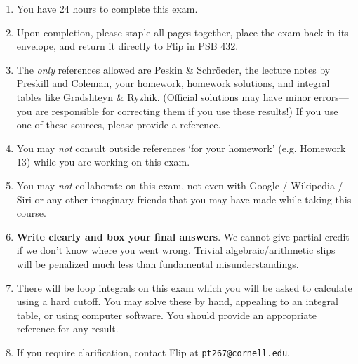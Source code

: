 \documentclass[12pt]{article}
\begin{document}

\vspace{.25cm}

\begin{spacing}{.55}
\begin{enumerate}
\item You have 24 hours to complete this exam. 
\item Upon completion, please staple all pages together, place the exam back in its envelope, and return it directly to Flip in PSB 432.
%
\item The \textit{only} references allowed are Peskin \& Schr\"oeder, the lecture notes by Preskill and Coleman, your homework, homework solutions, and integral tables like Gradshteyn \& Ryzhik. (Official solutions may have minor errors---you are responsible for correcting them if you use these results!) If you use one of these sources, please provide a reference.
\item You may \textit{not} consult outside references `for your homework' (e.g. Homework 13) while you are working on this exam.
\item You may \textit{not} collaborate on this exam, not even with Google / Wikipedia / Siri or any other imaginary friends that you may have made while taking this course.
\item \textbf{Write clearly and box your final answers}. We cannot give partial credit if we don't know where you went wrong. Trivial algebraic/arithmetic slips will be penalized much less than fundamental misunderstandings.
\item There will be loop integrals on this exam which you will be asked to calculate using a hard cutoff. You may solve these by hand, appealing to an integral table, or using computer software. You should provide an appropriate reference for any result.
\item If you require clarification, contact Flip at \texttt{pt267@cornell.edu}.
\end{enumerate}
\end{spacing}
\end{document}
